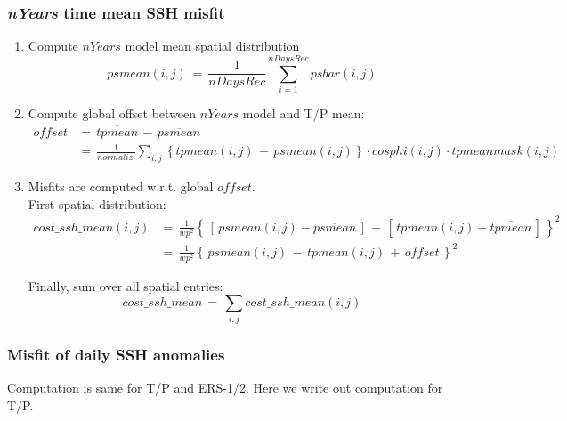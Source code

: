 \subsubsection{\textit{\textbf{nYears}} time mean SSH misfit}

\begin{enumerate}
%
\item
Compute $nYears$ model mean spatial distribution
%
\begin{equation}
psmean(i,j)\, =\, 
\frac{1}{nDaysRec} \sum_{i=1}^{nDaysRec}
psbar(i,j)
\end{equation}
%
\item
Compute global offset between $nYears$ model and T/P mean:
%
\begin{equation}
\begin{split}
offset & = \, \overline{tpmean} \, - \, \overline{psmean} \\
~ & = \, \frac{1}{normaliz.} \sum_{i,j}
\left\{ tpmean(i,j) \, - \, psmean(i,j) \right\} 
\cdot cosphi(i,j) \cdot tpmeanmask(i,j)
\end{split}
\end{equation}
%
\item
Misfits are computed w.r.t. global $offset$. 
\\
First spatial distribution:
%
\begin{equation}
\begin{split}
cost\_ssh\_mean(i,j) & = \,
\frac{1}{wp^2} \left\{ \,
\left[ \, psmean(i,j) - \overline{psmean} \, \right] \, - \,
\left[ \, tpmean(i,j) - \overline{tpmean} \, \right] \, \right\}^2 \\ 
~ & = \, \frac{1}{wp^2} \left\{ \,
psmean(i,j) \, - \, tpmean(i,j) \, + \, offset \, \right\}^2
\end{split}
\end{equation}

%
Finally, sum over all spatial entries:
\begin{equation}
\overline{cost\_ssh\_mean} \, = \,
\sum_{i,j} cost\_ssh\_mean(i,j)
\end{equation}



\end{enumerate}

\subsubsection{Misfit of daily SSH anomalies}

Computation is same for T/P and ERS-1/2.
Here we write out computation for T/P.

